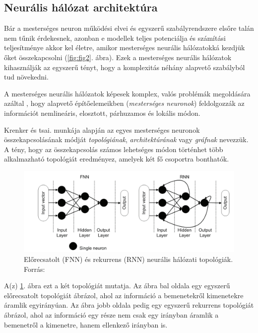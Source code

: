 \documentclass[12pt,a4]{article}
\begin{document}
	\subsection{Neurális hálózat architektúra}
	
	Bár a mesterséges neuron működési elvei és 
	egyszerű szabályrendszere elsőre talán nem tűnik érdekesnek, azonban e modellek teljes potenciálja és számítási teljesítménye akkor kel életre, 
	amikor mesterséges neurális hálózatokká
	kezdjük őket összekapcsolni (\ref{fig:fig2}. ábra). 
	Ezek a mesterséges neurális hálózatok 
	kihasználják az egyszerű tényt, 
	hogy a komplexitás néhány alapvető
	szabályból tud növekedni.
	
	A mesterséges neurális hálózatok 
	képesek komplex, valós problémák megoldására azáltal
	, hogy 
	alapvető építőelemeikben (\textit{mesterséges neuronok}) feldolgozzák az információt nemlineáris,
	elosztott, párhuzamos és lokális módon.
	
	Krenker és tsai. \cite{krenker} 
	   munkája alapján az egyes mesterséges 
	neuronok összekapcsolásának módját 
	\textit{topológiának}, \textit{architektúrának} 
	vagy \textit{gráfnak} nevezzük. A tény, 
	hogy az összekapcsolás
	számos lehetséges módon történhet több alkalmazható topológiát eredményez, amelyek két fő csoportra bonthatók. 

    \begin{figure}[h]	
		\centering
		\includegraphics[width=1\linewidth]{topologies}
        
		\caption{Előrecsatolt (FNN) és rekurrens (RNN) \newline\centering  neurális hálózati topológiák. 
			Forrás: \cite{krenker}}
        \label{fig:topologies}
	\end{figure}
	
	A(z) \ref{fig:topologies}. ábra ezt a két topológiát mutatja. Az ábra bal oldala egy egyszerű előrecsatolt topológiát ábrázol, ahol az információ a bemenetekről kimenetekre áramlik egyirányúan. Az ábra jobb oldala pedig egy egyszerű rekurrens topológiát ábrázol, ahol az információ egy része nem csak egy irányban áramlik a bemenetről a kimenetre, hanem ellenkező irányban is.
\end{document}
